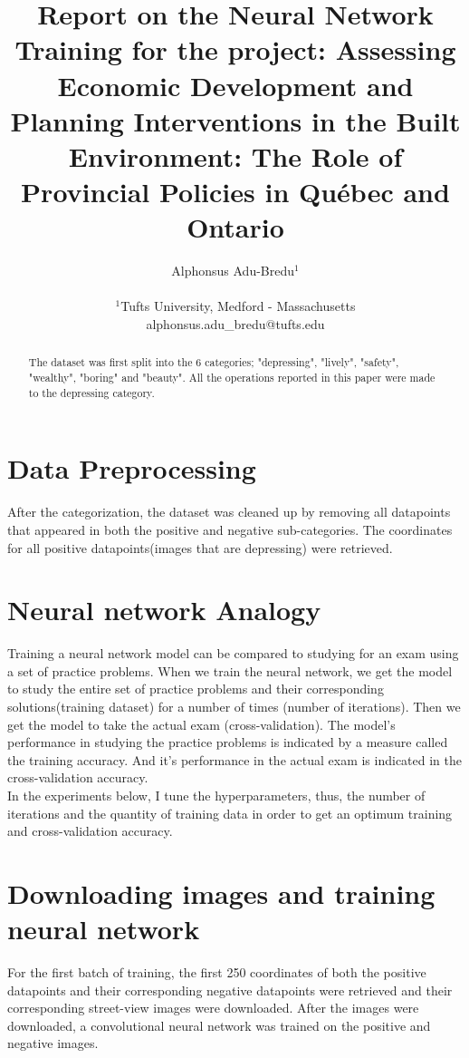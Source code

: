 \documentclass[letterpaper]{article}
\title{Report on the Neural Network Training for the project: Assessing Economic Development and Planning Interventions in the Built Environment: The Role of Provincial Policies in Québec and Ontario}
\author{Alphonsus Adu-Bredu$^{1}$ \\
\mbox{}\\
$^1$Tufts University, Medford - Massachusetts \\
alphonsus.adu\_bredu@tufts.edu}
\begin{document}
\maketitle

\begin{abstract}
	The dataset was first split into the 6 categories; "depressing", "lively", "safety", "wealthy", "boring" and "beauty". All the operations reported in this paper were made to the depressing category.
\end{abstract}
\section{Data Preprocessing}
After the categorization, the dataset was cleaned up by removing all datapoints that appeared in both the positive and negative sub-categories. The coordinates for all positive datapoints(images that are depressing) were retrieved. 

\section{Neural network Analogy}
Training a neural network model can be compared to studying for an exam using a set of practice problems. When we train the neural network, we get the model to study the entire set of practice problems and their corresponding solutions(training dataset) for a number of times (number of iterations). Then we get the model to take the actual exam (cross-validation). The model's performance in studying the practice problems is indicated by a measure called the training accuracy. And it's performance in the actual exam is indicated in the cross-validation accuracy.\\
In the experiments below, I tune the hyperparameters, thus, the number of iterations and the quantity of training data in order to get an optimum training and cross-validation accuracy.\\

\section{Downloading images and training neural network}
For the first batch of training, the first 250 coordinates of both the positive datapoints and their corresponding negative datapoints were retrieved and their corresponding street-view images were downloaded. After the images were downloaded, a convolutional neural network was trained on the positive and negative images. 
\end{document}
